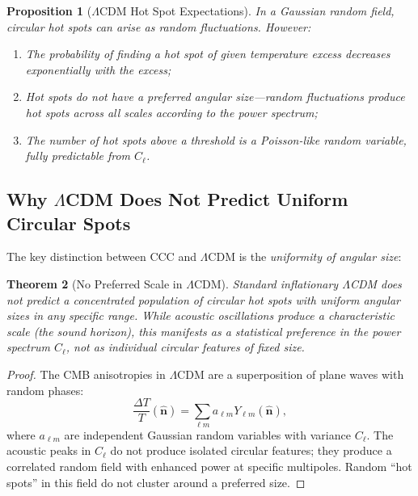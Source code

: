 \documentclass[11pt,a4paper]{article}
\theoremstyle{plain}
\newtheorem{theorem}{Theorem}[section]
\newtheorem{proposition}[theorem]{Proposition}
\theoremstyle{definition}
\theoremstyle{remark}
\begin{document}
\begin{proposition}[$\Lambda$CDM Hot Spot Expectations]\label{prop:lcdm_spots}
In a Gaussian random field, circular hot spots can arise as random fluctuations. However:
\begin{enumerate}
    \item The probability of finding a hot spot of given temperature excess decreases exponentially with the excess;
    \item Hot spots do not have a \emph{preferred angular size}---random fluctuations produce hot spots across all scales according to the power spectrum;
    \item The number of hot spots above a threshold is a Poisson-like random variable, fully predictable from $C_\ell$.
\end{enumerate}
\end{proposition}

\subsection{Why \texorpdfstring{$\Lambda$CDM}{LCDM} Does Not Predict Uniform Circular Spots}

The key distinction between CCC and $\Lambda$CDM is the \emph{uniformity of angular size}:

\begin{theorem}[No Preferred Scale in $\Lambda$CDM]\label{thm:no_scale}
Standard inflationary $\Lambda$CDM does not predict a \emph{concentrated population} of circular hot spots with uniform angular sizes in any specific range. While acoustic oscillations produce a characteristic scale (the sound horizon), this manifests as a statistical preference in the power spectrum $C_\ell$, not as individual circular features of fixed size.
\end{theorem}

\begin{proof}
The CMB anisotropies in $\Lambda$CDM are a superposition of plane waves with random phases:
\begin{equation}
    \frac{\Delta T}{T}(\hat{\bm{n}}) = \sum_{\ell m} a_{\ell m} Y_{\ell m}(\hat{\bm{n}}),
\end{equation}
where $a_{\ell m}$ are independent Gaussian random variables with variance $C_\ell$. The acoustic peaks in $C_\ell$ do not produce isolated circular features; they produce a correlated random field with enhanced power at specific multipoles. Random ``hot spots'' in this field do not cluster around a preferred size.
\end{proof}
\end{document}
